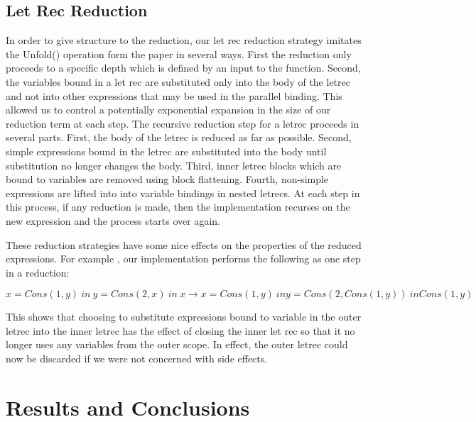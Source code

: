 \documentclass[preprint, 10pt]{sigplanconf}
\begin{document}
\subsection{Let Rec Reduction}
In order to give structure to the reduction, our let rec reduction strategy imitates the Unfold() operation form the paper in several ways.  First the reduction only proceeds to a specific depth which is defined by an input to the function.  Second, the variables bound in a let rec are substituted only into the body of the letrec and not into other expressions that may be used in the parallel binding.  This allowed us to control a potentially exponential expansion in the size of our reduction term at each step.  The recursive reduction step for a letrec proceeds in several parts.  First, the body of the letrec is reduced as far as possible.  Second, simple expressions bound in the letrec are substituted into the body until substitution no longer changes the body. Third, inner letrec blocks which are bound to variables are removed using block flattening.  Fourth, non-simple expressions are lifted into into variable bindings in nested letrecs. At each step in this process, if any reduction is made, then the implementation recurses on the new expression and the process starts over again.

These reduction strategies have some nice effects on the properties of the reduced expressions.  For example , our implementation performs the following as one step in a reduction:
\begin{center}
${x=Cons(1,y)\ in\ {y=Cons(2,x)\ in\ x}} \rightarrow 
{x=Cons(1,y)\ in {y=Cons(2,Cons(1,y))\ in Cons(1,y)}}$
\end{center}

This shows that choosing to substitute expressions bound to variable in the outer letrec into the inner letrec has the effect of closing the inner let rec so that it no longer uses any variables from the outer scope.  In effect, the outer letrec could now be discarded if we were not concerned with side effects.

\section{Results and Conclusions}





\end{document}
